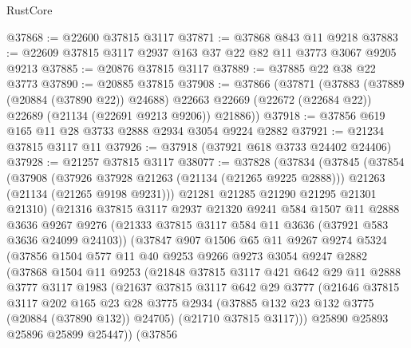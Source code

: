 \begin{lexlean}{RustCore}
\begin{coremodule}
@37868 := @22600 @37815 @3117
@37871 := @37868 @843 @11 @9218
@37883 := @22609 @37815 @3117 @2937 @163 @37 @22 @82 @11 @3773 @3067 @9205 @9213
@37885 := @20876 @37815 @3117
@37889 := @37885 @22 @38 @22 @3773
@37890 := @20885 @37815
@37908 := @37866
    (@37871
      (@37883
        (@37889 (@20884 (@37890 @22)) @24688)
        @22663
        @22669
        (@22672 (@22684 @22))
        @22689
        (@21134 (@22691 @9213 @9206))
        @21886))
@37918 := @37856 @619 @165 @11 @28 @3733 @2888 @2934 @3054 @9224 @2882
@37921 := @21234 @37815 @3117 @11
@37926 := @37918 (@37921 @618 @3733 @24402 @24406)
@37928 := @21257 @37815 @3117
@38077 := @37828
    (@37834
      (@37845
        (@37854
          (@37908
            (@37926 @37928 @21263 (@21134 (@21265 @9225 @2888)))
            @21263
            (@21134 (@21265 @9198 @9231)))
          @21281
          @21285
          @21290
          @21295
          @21301
          @21310)
        (@21316
          @37815
          @3117
          @2937
          @21320
          @9241
          @584
          @1507
          @11
          @2888
          @3636
          @9267
          @9276
          (@21333 @37815 @3117 @584 @11 @3636 (@37921 @583 @3636 @24099 @24103))
          (@37847
            @907
            @1506
            @65
            @11
            @9267
            @9274
            @5324
            (@37856
              @1504
              @577
              @11
              @40
              @9253
              @9266
              @9273
              @3054
              @9247
              @2882
              (@37868
                @1504
                @11
                @9253
                (@21848
                  @37815
                  @3117
                  @421
                  @642
                  @29
                  @11
                  @2888
                  @3777
                  @3117
                  @1983
                  (@21637
                    @37815
                    @3117
                    @642
                    @29
                    @3777
                    (@21646
                      @37815
                      @3117
                      @202
                      @165
                      @23
                      @28
                      @3775
                      @2934
                      (@37885 @132 @23 @132 @3775 (@20884 (@37890 @132)) @24705)
                      (@21710 @37815 @3117)))
                  @25890
                  @25893
                  @25896
                  @25899
                  @25447))
              (@37856

\end{coremodule}
\end{lexlean}
